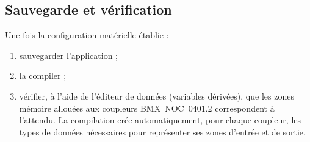 \subsection{Sauvegarde et vérification}

Une fois la configuration matérielle établie :

\begin{enumerate}
    \item sauvegarder l'application ;
    \item la compiler ;
    \item vérifier, à l'aide de l'éditeur de données (variables dérivées),
    que les zones mémoire allouées aux coupleurs BMX~NOC~0401.2
    correspondent à l'attendu. La compilation crée automatiquement, pour
    chaque coupleur, les types de données nécessaires pour représenter ses
    zones d'entrée et de sortie.
\end{enumerate}
